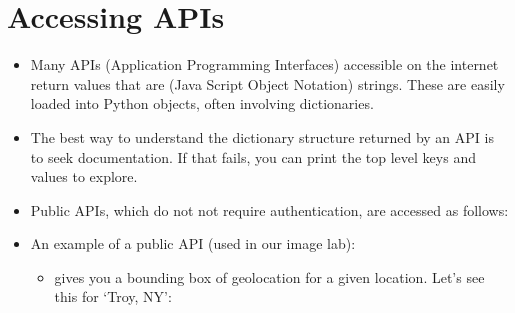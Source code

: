 \documentclass[letterpaper,10pt,english]{sphinxmanual}
\begin{document}
\section{Accessing APIs}
\label{\detokenize{lecture_notes/lec17_dictionaries2:accessing-apis}}\begin{itemize}
\item {} 
Many APIs (Application Programming Interfaces) accessible on the
internet return values that are  (Java Script Object
Notation) strings.  These are easily loaded into Python objects,
often involving dictionaries.

\item {} 
The best way to understand the dictionary structure returned by an API
is to seek documentation. If that fails, you can print the top
level keys and values to explore.

\item {} 
Public APIs, which do not not require authentication, are accessed
as follows:

%
\begin{sphinxVerbatim}[commandchars=\\\{\}]
 
 

  
  
  
  
\end{sphinxVerbatim}

\item {} 
An example of a public API (used in our image lab):
\begin{itemize}
\item {} 
 gives you a bounding box of geolocation for a given
location. Let’s see this for ‘Troy, NY’:

%
\begin{sphinxVerbatim}[commandchars=\\\{\}]
  \PYGZbs{}
      \PYGZbs{}
\end{sphinxVerbatim}


\end{itemize}
\end{itemize}
\end{document}
